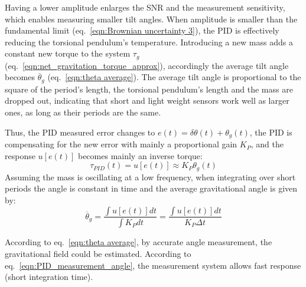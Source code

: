 \documentclass[\main/master.tex]{subfiles}
\begin{document}
\par\noindent
Having a lower amplitude enlarges the SNR and the measurement sensitivity, which enables measuring smaller tilt angles. When amplitude is smaller than the fundamental limit (eq.~\ref{eqn:Brownian uncertainty 3}), the PID is effectively reducing the torsional pendulum's temperature. Introducing a new mass adds a constant new torque to the system $\tau_g$ (eq.~\ref{eqn:net_gravitation_torque_approx}), accordingly the average tilt angle becomes $\overline{\theta}_g$ (eq.~\ref{eqn:theta average}). The average tilt angle is proportional to the square of the period's length, the torsional pendulum's length and the mass are dropped out, indicating that short and light weight sensors work well as larger ones, as long as their periods are the same. 
\par\noindent
Thus, the PID measured error  changes to $e(t) = \delta\theta(t) + \theta_g(t)$, the PID is compensating for the new error with mainly a proportional gain $K_P$, and the response $u[e(t)]$ becomes mainly an inverse torque:
\begin{equation}
\tau_{PID}(t) = u[e(t)] \approx K_P\theta_g(t) 
\label{eqn:PID_response}
\end{equation}
Assuming the mass is oscillating at a low frequency, when integrating over short periods the angle is constant in time and the average gravitational angle is given by:
\begin{equation}
\overline{\theta}_g = \frac{\int u[e(t)] dt}{\int K_P dt}= \frac{\int u[e(t)] dt}{ K_P \Delta t}
\label{eqn:PID_measurement_angle}
\end{equation}
\par\noindent
According to eq.~\ref{eqn:theta average}, by accurate angle measurement, the gravitational field could be estimated. According to eq.~\ref{eqn:PID_measurement_angle}, the measurement system allows fast response (short integration time). 
\end{document}
